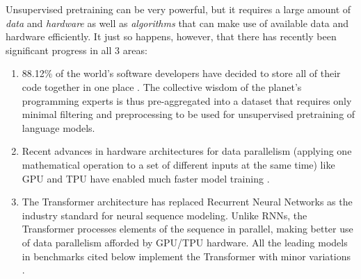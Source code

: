 Unsupervised pretraining can be very powerful, but it requires a large amount of \emph{data} and \emph{hardware} as well as \emph{algorithms} that can make use of available data and hardware efficiently. 
It just so happens, however, that there has recently been significant progress in all 3 areas:
\begin{enumerate}
    \item 88.12\% of the world's software developers have decided to store all of their code together in one place \cite{GithubMarketShare}. The collective wisdom of the planet's programming experts is thus pre-aggregated into a dataset that requires only minimal filtering and preprocessing \cite{kocetkovStack3TB2022} to be used for unsupervised pretraining of language models.
    \item Recent advances in hardware architectures for data parallelism (applying one mathematical operation to a set of different inputs at the same time) like GPU \cite{dallyEvolutionGraphicsProcessing2021} and TPU \cite{jouppiMotivationEvaluationFirst2018} have enabled much faster model training \cite{wangBenchmarkingTPUGPU2019}. 
    \item The Transformer architecture \cite{vaswaniAttentionAllYou2023} has replaced Recurrent Neural Networks \cite{hochreiterLongShorttermMemory1997,choPropertiesNeuralMachine2014} as the industry standard for neural sequence modeling. Unlike RNNs, the Transformer processes elements of the sequence in parallel, making better use of data parallelism afforded by GPU/TPU hardware. All the leading models in benchmarks cited below implement the Transformer with minor variations \cite{raffelExploringLimitsTransfer2023,wangGrokkedTransformersAre2024,geipingCrammingTrainingLanguage2022,liuBetterFewShotFinetuning2023,liuSwinTransformerV22022,rabeSelfattentionDoesNot2022,soPrimerSearchingEfficient2022,sunLengthExtrapolatableTransformer2022,xieResiDualTransformerDual2023,burtsevMemoryTransformer2021,dingCogViewMasteringTexttoImage2021,dingERNIEDocRetrospectiveLongDocument2021,henryQueryKeyNormalizationTransformers2020,heRealFormerTransformerLikes2021,huangAttentionAttentionImage2019,luUnderstandingImprovingTransformer2019,nguyenTransformersTearsImproving2019,parisottoStabilizingTransformersReinforcement2019,PathwaysLanguageModel,pressImprovingTransformerModels2020,pressTRAINSHORTTEST2022,shazeerFastTransformerDecoding2019,shazeerGLUVariantsImprove2020,shazeerTalkingHeadsAttention2020,shleiferNormFormerImprovedTransformer2021,sukhbaatarAugmentingSelfattentionPersistent2019,wangCrossFormerVersatileVision2021,zhangRootMeanSquare2019,zhaoExplicitSparseTransformer2019}.
\end{enumerate}

